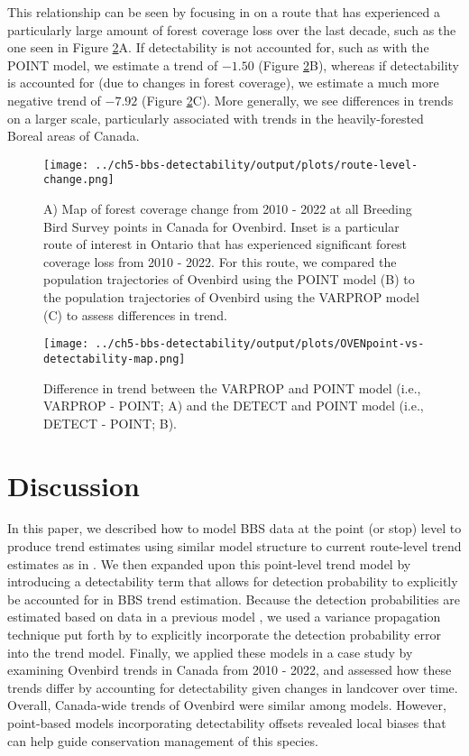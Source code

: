 \par This relationship can be seen by focusing in on a route that has experienced a particularly large amount of forest coverage loss over the last decade, such as the one seen in Figure \ref{fig:route-change}A. 
If detectability is not accounted for, such as with the POINT model, we estimate a trend of $-1.50$ (Figure \ref{fig:route-change}B), whereas if detectability is accounted for (due to changes in forest coverage), we estimate a much more negative trend of $-7.92$ (Figure \ref{fig:route-change}C).
More generally, we see differences in trends on a larger scale, particularly associated with trends in the heavily-forested Boreal areas of Canada.

\begin{figure}[h]
	\texttt{[image: ../ch5-bbs-detectability/output/plots/route-level-change.png]}
	\caption{A) Map of forest coverage change from 2010 - 2022 at all Breeding Bird Survey points in Canada for Ovenbird. Inset is a particular route of interest in Ontario that has experienced significant forest coverage loss from 2010 - 2022. For this route, we compared the population trajectories of Ovenbird using the POINT model (B) to the population trajectories of Ovenbird using the VARPROP model (C) to assess differences in trend.}
	\label{fig:route-change}
\end{figure}

\begin{figure}[h]
	\texttt{[image: ../ch5-bbs-detectability/output/plots/OVENpoint-vs-detectability-map.png]}
	\caption{Difference in trend between the VARPROP and POINT model (i.e., VARPROP - POINT; A) and the DETECT and POINT model (i.e., DETECT - POINT; B).}
	\label{fig:route-change}
\end{figure}

\section{Discussion}

\par In this paper, we described how to model BBS data at the point (or stop) level to produce trend estimates using similar model structure to current route-level trend estimates as in \citet{smith_spatially_2023}.
We then expanded upon this point-level trend model by introducing a detectability term that allows for detection probability to explicitly be accounted for in BBS trend estimation.
Because the detection probabilities are estimated based on data in a previous model \citep{edwards_point_2023}, we used a variance propagation technique put forth by \citet{bravington_variance_2021} to explicitly incorporate the detection probability error into the trend model.
Finally, we applied these models in a case study by examining Ovenbird trends in Canada from 2010 - 2022, and assessed how these trends differ by accounting for detectability given changes in landcover over time.
Overall, Canada-wide trends of Ovenbird were similar among models.
However, point-based models incorporating detectability offsets revealed local biases that can help guide conservation management of this species.


